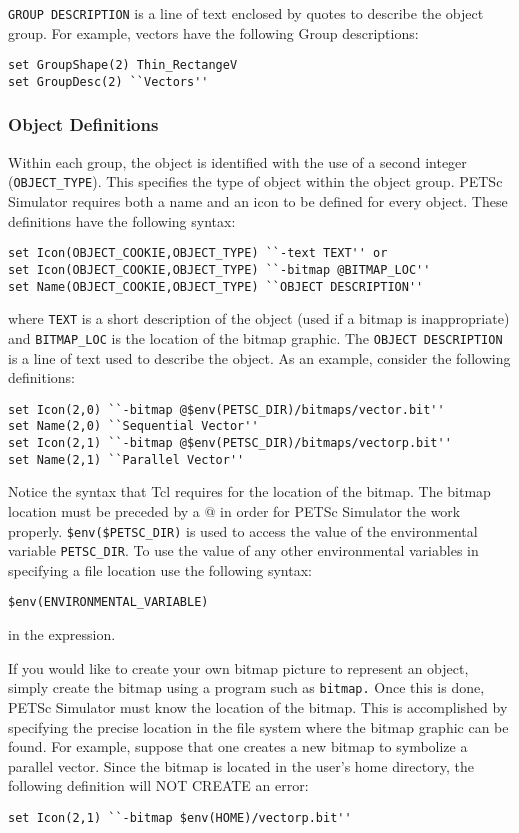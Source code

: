 {\tt GROUP DESCRIPTION} is a line of text enclosed by quotes to describe the object group.  For example, vectors have the following Group descriptions:
\begin{verbatim}
set GroupShape(2) Thin_RectangeV 
set GroupDesc(2) ``Vectors''
\end{verbatim}

\subsubsection{Object Definitions}

Within each group, the object is identified with the use of a second integer ({\tt OBJECT\_TYPE}).  This specifies the type of object within the object group.  PETSc Simulator requires both a name and an icon to be defined for every object.  These definitions have the following syntax:
\begin{verbatim}
set Icon(OBJECT_COOKIE,OBJECT_TYPE) ``-text TEXT'' or 
set Icon(OBJECT_COOKIE,OBJECT_TYPE) ``-bitmap @BITMAP_LOC'' 
set Name(OBJECT_COOKIE,OBJECT_TYPE) ``OBJECT DESCRIPTION''
\end{verbatim}
where {\tt TEXT} is a short description of the object (used if a bitmap is inappropriate) and {\tt BITMAP\_LOC} is the location of the bitmap graphic.  The {\tt OBJECT DESCRIPTION} is a line of text used to describe the object.  As an example, consider the following definitions:
\begin{verbatim}
set Icon(2,0) ``-bitmap @$env(PETSC_DIR)/bitmaps/vector.bit'' 
set Name(2,0) ``Sequential Vector'' 
set Icon(2,1) ``-bitmap @$env(PETSC_DIR)/bitmaps/vectorp.bit'' 
set Name(2,1) ``Parallel Vector''
\end{verbatim}
Notice the syntax that Tcl requires for the location of the bitmap.  The bitmap location must be preceded by a $@$ in order for PETSc Simulator the work properly.   {\tt \$env(\$PETSC\_DIR)} is used to access the value of the environmental variable {\tt PETSC\_DIR}.  To use the value of any other environmental variables in specifying a file location use the following syntax:
\begin{verbatim}
$env(ENVIRONMENTAL_VARIABLE)
\end{verbatim}
in the expression.

If you would like to create your own bitmap picture to represent an object, simply create the bitmap using a program such as {\tt bitmap.}  Once this is done, PETSc Simulator must know the location of the bitmap.  This is accomplished by specifying the precise location in the file system where the bitmap graphic can be found.  For example, suppose that one creates a new bitmap to symbolize a parallel vector.  Since the bitmap is located in the user's home directory, the following definition will NOT CREATE an error:
\begin{verbatim}
set Icon(2,1) ``-bitmap $env(HOME)/vectorp.bit''
\end{verbatim}

